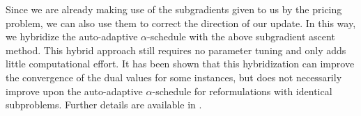 Since we are already making use of the subgradients given to us by the pricing problem, we can also use them to correct the direction of our update. In this way, we hybridize the auto-adaptive $\alpha$-schedule with the above subgradient ascent method. This hybrid approach still requires no parameter tuning and only adds little computational effort. It has been shown that this hybridization can improve the convergence of the dual values for some instances, but does not necessarily improve upon the auto-adaptive $\alpha$-schedule for reformulations with identical subproblems. Further details are available in \cite{pessoa2013out,pessoa2018automation}.
